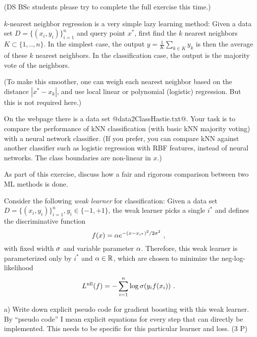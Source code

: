 

\renewcommand{\course}{Machine Learning}
\renewcommand{\exnum}{10}

\exercises

(DS BSc students please try to complete the full exercise this time.)



$k$-nearest neighbor regression is a very simple lazy learning method: Given a data set $D=\{(x_i,y_i)\}_{i=1}^n$ and query point $x^*$, first find the $k$ nearest neighbors $K\subset \{1,..,n\}$. In the simplest case, the output $y = \frac{1}{K} \sum_{k\in K} y_k$ is then the average of these $k$ nearest neighbors. In the classification case, the output is the majority vote of the neighbors.

(To make this smoother, one can weigh each nearest neighbor based on the distance $|x^*-x_k|$, and use local linear or polynomial (logistic) regression. But this is not required here.)

On the webpage there is a data set @data2ClassHastie.txt@. Your task is to compare the performance of kNN classification (with basic kNN majority voting) with a neural network classifier. (If you prefer, you can compare kNN against another classifier such as logistic regression with RBF features, instead of neural networks. The class boundaries are non-linear in $x$.)

As part of this exercise, discuss how a fair and rigorous comparison between two ML methods is done.




Consider the following \emph{weak learner} for classification: Given a
data set $D=\{(x_i,y_i)\}_{i=1}^n, y_i\in\{-1,+1\}$, the weak learner
picks a single $i^*$ and defines the discriminative function
$$ f(x) = \alpha e^{-(x-x_{i^*})^2/2\sigma^2} ~, $$
with fixed width $\sigma$ and
variable parameter $\alpha$. Therefore, this weak learner is parameterized
only by $i^*$ and $\alpha\in{\mathbb{R}}$, which are chosen to minimize the
neg-log-likelihood
$$L^\text{nll}(f) = -\sum_{i=1}^n \log \sigma(y_i f(x_i))  ~.$$

a) Write down explicit pseudo code for gradient boosting with
this weak learner. By ``pseudo code'' I mean explicit equations
for every step that can directly be implemented. This needs
to be specific for this particular learner and loss. (3 P)

